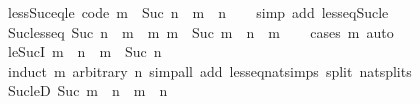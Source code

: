 \begin{isabellebody}
\endisatagproof
{\isafoldproof}%
%
\isadelimproof
\isanewline
%
\endisadelimproof
\isanewline
{}\isamarkupfalse%
\ less{\isacharunderscore}{\kern0pt}Suc{\isacharunderscore}{\kern0pt}eq{\isacharunderscore}{\kern0pt}le\ {\isacharbrackleft}{\kern0pt}code{\isacharbrackright}{\kern0pt}{\isacharcolon}{\kern0pt}\ {\isachardoublequoteopen}m\ {\isacharless}{\kern0pt}\ Suc\ n\ {\isasymlongleftrightarrow}\ m\ {\isasymle}\ n{\isachardoublequoteclose}\isanewline
%
\isadelimproof
\ \ %
\endisadelimproof
%
\isatagproof
{}\isamarkupfalse%
\ {\isacharparenleft}{\kern0pt}simp\ add{\isacharcolon}{\kern0pt}\ less{\isacharunderscore}{\kern0pt}eq{\isacharunderscore}{\kern0pt}Suc{\isacharunderscore}{\kern0pt}le{\isacharparenright}{\kern0pt}%
\endisatagproof
{\isafoldproof}%
%
\isadelimproof
\isanewline
%
\endisadelimproof
\isanewline
{}\isamarkupfalse%
\ Suc{\isacharunderscore}{\kern0pt}less{\isacharunderscore}{\kern0pt}eq{}{\isacharcolon}{\kern0pt}\ {\isachardoublequoteopen}Suc\ n\ {\isacharless}{\kern0pt}\ m\ {\isasymlongleftrightarrow}\ {\isacharparenleft}{\kern0pt}{\isasymexists}m{\isacharprime}{\kern0pt}{\isachardot}{\kern0pt}\ m\ {\isacharequal}{\kern0pt}\ Suc\ m{\isacharprime}{\kern0pt}\ {\isasymand}\ n\ {\isacharless}{\kern0pt}\ m{\isacharprime}{\kern0pt}{\isacharparenright}{\kern0pt}{\isachardoublequoteclose}\isanewline
%
\isadelimproof
\ \ %
\endisadelimproof
%
\isatagproof
{}\isamarkupfalse%
\ {\isacharparenleft}{\kern0pt}cases\ m{\isacharparenright}{\kern0pt}\ auto%
\endisatagproof
{\isafoldproof}%
%
\isadelimproof
\isanewline
%
\endisadelimproof
\isanewline
{}\isamarkupfalse%
\ le{\isacharunderscore}{\kern0pt}SucI{\isacharcolon}{\kern0pt}\ {\isachardoublequoteopen}m\ {\isasymle}\ n\ {\isasymLongrightarrow}\ m\ {\isasymle}\ Suc\ n{\isachardoublequoteclose}\isanewline
%
\isadelimproof
\ \ %
\endisadelimproof
%
\isatagproof
{}\isamarkupfalse%
\ {\isacharparenleft}{\kern0pt}induct\ m\ arbitrary{\isacharcolon}{\kern0pt}\ n{\isacharparenright}{\kern0pt}\ {\isacharparenleft}{\kern0pt}simp{\isacharunderscore}{\kern0pt}all\ add{\isacharcolon}{\kern0pt}\ less{\isacharunderscore}{\kern0pt}eq{\isacharunderscore}{\kern0pt}nat{\isachardot}{\kern0pt}simps{\isacharparenleft}{\kern0pt}{}{\isacharparenright}{\kern0pt}\ split{\isacharcolon}{\kern0pt}\ nat{\isachardot}{\kern0pt}splits{\isacharparenright}{\kern0pt}%
\endisatagproof
{\isafoldproof}%
%
\isadelimproof
\isanewline
%
\endisadelimproof
\isanewline
{}\isamarkupfalse%
\ Suc{\isacharunderscore}{\kern0pt}leD{\isacharcolon}{\kern0pt}\ {\isachardoublequoteopen}Suc\ m\ {\isasymle}\ n\ {\isasymLongrightarrow}\ m\ {\isasymle}\ n{\isachardoublequoteclose}\isanewline

\end{isabellebody}
